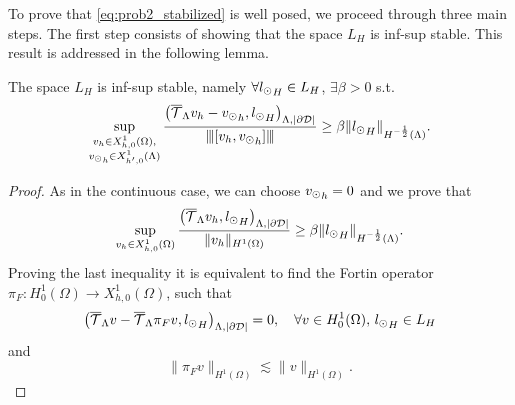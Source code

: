 To prove that \eqref{eq:prob2_stabilized} is well posed, we proceed through three main steps. The first step consists of showing that the space $L_H$ is inf-sup stable. This result is addressed in the following lemma. 
\begin{lemma}\label{lemma:Lh_infsup}
The space $L_H$ is inf-sup stable, namely $\forall {l_{\odot}}_H \in L_H$, $\exists \beta >0$ s.t.
\begin{equation*}
\sup_{\substack{v_h \in X_{h,0}^1(\Omega),\\ {v_{\odot}}_h \in X_{h',0}^1(\Lambda)}} \frac{\left({\overline{\mathcal{T}}_\Lambda} v_h - {v_{\odot}}_h, {l_{\odot}} _H\right)_{\Lambda, |\partial\mathcal{D}|}}{{\left\vert\kern-0.25ex\left\vert\kern-0.25ex\left\vert [v_h, {v_{\odot}}_h] \right\vert\kern-0.25ex\right\vert\kern-0.25ex\right\vert}} \geq \beta \|{l_{\odot}}_H\|_{H^{-\frac 12}(\Lambda)}.
\end{equation*} 
\end{lemma}
\begin{proof}
As in the continuous case, we can choose ${v_{\odot}}_h=0$ and we prove that
\begin{equation*} 
\sup_{v_h \in X_{h,0}^1(\Omega)} \frac{\left({\overline{\mathcal{T}}_\Lambda} v_h ,{l_{\odot}}_H\right)_{\Lambda, |\partial\mathcal{D}|}}{\|v_h\|_{H^1(\Omega)}} \geq \beta \|{l_{\odot}}_H\|_{H^{-\frac 12}(\Lambda)}.
\end{equation*} 
Proving the last inequality it is equivalent to find the Fortin operator $\pi_F: H^1_0(\Omega) \rightarrow X_{h,0}^1(\Omega)$, such that 
\begin{equation*}
\left({\overline{\mathcal{T}}_\Lambda} v - {\overline{\mathcal{T}}_\Lambda} \pi _F v  , {l_{\odot}}_H\right)_{\Lambda, |\partial\mathcal{D}|}=0, \quad \forall v\in H^1_0(\Omega), \, {l_{\odot}}_H \in L_H
\end{equation*} 
and
\begin{equation}\label{eq:cont_Fortin}
\|\pi_F v\|_{H^1(\Omega)}\lesssim \|v\|_{H^1(\Omega)}.
\end{equation} 


\end{proof}
